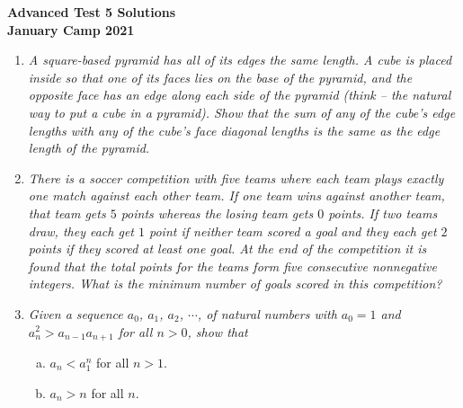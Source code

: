 \documentclass{article}
\begin{document}
\thispagestyle{empty}

\begin{center}
  \textbf{\Large Advanced Test 5 Solutions}
  \\ \vspace{1em}
  \textbf{\large January Camp 2021}
\end{center}

\vspace{12pt}

\begin{enumerate}[1.]

\item %
{\itshape A square-based pyramid has all of its edges the same length.
A cube is placed inside so that one of its faces lies on the base of the pyramid, and the opposite face has an edge along each side of the pyramid (think -- the natural way to put a cube in a pyramid).
Show that the sum of any of the cube's edge lengths with any of the cube's face diagonal lengths is the same as the edge length of the pyramid.}


\item %
{\itshape There is a soccer competition with five teams where each team plays exactly one match against each other team.
If one team wins against another team, that team gets $5$ points whereas the losing team gets $0$ points.
If two teams draw, they each get $1$ point if neither team scored a goal and they each get $2$ points if they scored at least one goal.
At the end of the competition it is found that the total points for the teams form five consecutive nonnegative integers.
What is the minimum number of goals scored in this competition?}


\item %
{\itshape Given a sequence $a_0$, $a_1$, $a_2$, $\cdots$, of natural numbers with $a_0 = 1$ and $a_{n}^2 > a_{n - 1}a_{n + 1}$ for all $n > 0$, show that 
\begin{enumerate}[a)]
  \item $a_n < a_1^n$ for all $n > 1$.
  \item $a_n > n$ for all $n$.
\end{enumerate}}


\end{enumerate}
\end{document}
